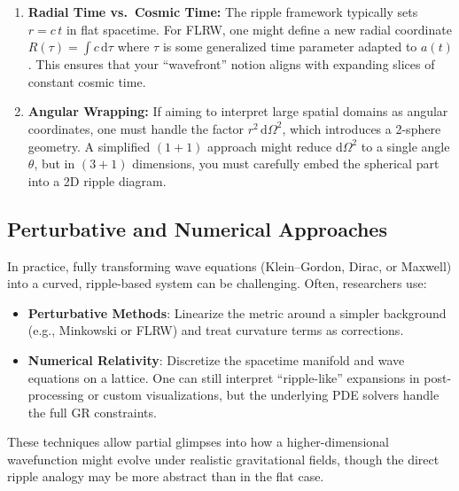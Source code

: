 \documentclass{article}
\begin{document}
\begin{enumerate}
  \item \textbf{Radial Time vs.\ Cosmic Time:}  
    The ripple framework typically sets $r = c\,t$ in flat spacetime. 
    For FLRW, one might define a new radial coordinate $R(\tau) = \int c\,\mathrm{d}\tau$ 
    where $\tau$ is some generalized time parameter adapted to $a(t)$. 
    This ensures that your ``wavefront'' notion aligns with expanding slices 
    of constant cosmic time.
  \item \textbf{Angular Wrapping:}  
    If aiming to interpret large spatial domains as angular coordinates, 
    one must handle the factor $r^2\,\mathrm{d}\Omega^2$, which introduces 
    a 2-sphere geometry. A simplified $(1+1)$ approach might reduce $\mathrm{d}\Omega^2$ 
    to a single angle $\theta$, but in $(3+1)$ dimensions, you must carefully 
    embed the spherical part into a 2D ripple diagram.
\end{enumerate}

\subsection{Perturbative and Numerical Approaches}
\label{app:subsec:perturb-numerical}
In practice, fully transforming wave equations (Klein--Gordon, Dirac, or Maxwell) 
into a curved, ripple-based system can be challenging. Often, researchers use:

\begin{itemize}
  \item \textbf{Perturbative Methods}: Linearize the metric around a simpler background 
        (e.g., Minkowski or FLRW) and treat curvature terms as corrections.  
  \item \textbf{Numerical Relativity}: Discretize the spacetime manifold and wave equations 
        on a lattice. One can still interpret “ripple-like” expansions in post-processing 
        or custom visualizations, but the underlying PDE solvers handle the full GR constraints.
\end{itemize}

\noindent
These techniques allow partial glimpses into how a higher-dimensional wavefunction 
might evolve under realistic gravitational fields, though the direct ripple analogy 
may be more abstract than in the flat case.
\end{document}
